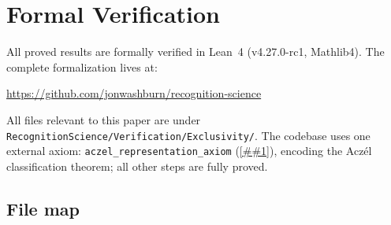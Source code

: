 \documentclass[11pt]{article}
\providecommand{\cref}[1]{\ref{##1}}%
\theoremstyle{definition}
\theoremstyle{remark}
\begin{document}
\appendix
\section{Formal Verification}\label{app:lean}

All proved results are formally verified in Lean~4 (v4.27.0-rc1,
Mathlib4).
The complete formalization lives at:
\begin{center}
\url{https://github.com/jonwashburn/recognition-science}
\end{center}
All files relevant to this paper are under
\texttt{RecognitionScience/Verification/Exclusivity/}.
The codebase uses one external axiom:
\texttt{aczel\_representation\_axiom} (\cref{thm:aczel}),
encoding the Acz\'el classification theorem; all other steps
are fully proved.

\subsection*{File map}
\end{document}
